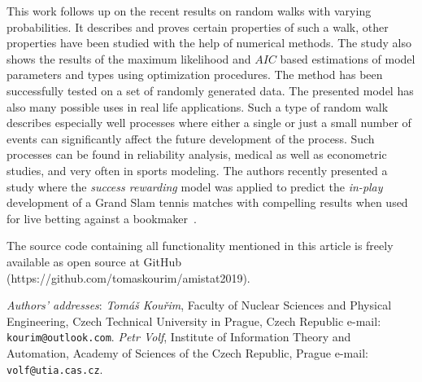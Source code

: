\documentclass{amsart}
\theoremstyle{definition}
\theoremstyle{plain}
\theoremstyle{plain}
\theoremstyle{plain}
\numberwithin{equation}{section}
\begin{document}
    This work follows up on the recent results on random walks with varying
    probabilities.
    It describes and proves certain properties of such
    a walk, other properties have been studied with the help of numerical
    methods.
    The study also shows the results of the maximum likelihood
    and $AIC$ based estimations of model parameters and types using optimization
    procedures.
    The method has been successfully tested on a set of randomly
    generated data.
    The presented model has also many possible uses in
    real life applications.
    Such a type of random walk describes especially
    well processes where either a single or just a small number of events
    can significantly affect the future development of the process.
    Such
    processes can be found in reliability analysis, medical as well as
    econometric studies, and very often in sports modeling.
    The authors
    recently  {\color{blue}presented} a study where the \emph{\color{blue}success rewarding} model was applied
    to predict the \emph{in-play} development of a Grand Slam tennis matches
    with compelling results when used for live betting against a bookmaker~{\color{blue}\cite{ ja2019mathsport_proc,ja2019imam}}.

    The source code containing all functionality mentioned in this article
    is freely available as open source at
    GitHub (https://github.com/tomaskourim/amistat2019).


    
    

    {\small
    {\em Authors' addresses}:
        {\em Tom\'{a}\v{s} Kou\v{r}im}, Faculty of Nuclear Sciences and Physical Engineering, Czech Technical University in Prague,
    Czech Republic
    e-mail: \texttt{kourim@\allowbreak outlook.com}.
        {\em Petr Volf}, Institute of Information Theory and Automation, Academy of Sciences of the Czech Republic, Prague
    e-mail: \texttt{volf@\allowbreak utia.cas.cz}.
    }
\end{document}
